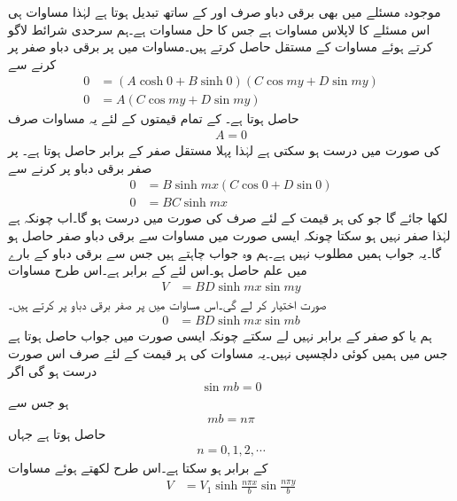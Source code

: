 موجودہ مسئلے میں بھی برقی دباو صرف  اور  کے ساتھ تبدیل ہوتا ہے لہٰذا مساوات  ہی اس مسئلے کا لاپلاس مساوات ہے جس کا حل مساوات  ہے۔ہم سرحدی شرائط لاگو کرتے ہوئے مساوات کے مستقل حاصل کرتے ہیں۔مساوات  میں  پر برقی دباو صفر پر کرنے سے
\begin{align*}
0&=\left( A \cosh 0+B \sinh 0\right) \left(C \cos m y+D \sin m y \right)\\
0&=A \left(C \cos m y+D \sin m y \right)
\end{align*}
حاصل ہوتا ہے۔  کے تمام قیمتوں کے لئے یہ مساوات صرف 
\begin{align*}
A=0
\end{align*}
کی صورت میں درست ہو سکتی ہے لہٰذا پہلا مستقل صفر کے برابر حاصل ہوتا ہے۔ پر صفر برقی دباو پر کرنے سے
\begin{align*}
0&=B \sinh mx  \left(C \cos 0+D \sin 0 \right)\\
0&=BC \sinh mx 
\end{align*}
لکھا جائے گا جو  کی ہر قیمت کے لئے صرف  کی صورت میں درست ہو گا۔اب چونکہ  ہے لہٰذا  صفر نہیں ہو سکتا چونکہ ایسی صورت میں مساوات  سے برقی دباو صفر حاصل ہو گا۔یہ جواب ہمیں مطلوب نہیں ہے۔ہم وہ جواب چاہتے ہیں جس سے برقی دباو کے بارے میں علم حاصل ہو۔اس لئے  کے برابر ہے۔اس طرح مساوات 
\begin{align}\label{مساوات_لاپلاس_ڈبہ_مثال}
V&=BD \sinh mx  \sin m y 
\end{align}
صورت اختیار کر لے گی۔اس مساوات میں  پر صفر برقی دباو پر کرتے ہیں۔
 \begin{align*}
0&=BD \sinh mx  \sin m b 
\end{align*}
ہم  یا  کو صفر کے برابر نہیں لے سکتے چونکہ ایسی صورت میں  جواب حاصل ہوتا ہے جس میں ہمیں کوئی دلچسپی نہیں۔یہ مساوات  کی ہر قیمت کے لئے صرف اس صورت درست ہو گی اگر 
\begin{align*}
\sin mb=0
\end{align*}
ہو جس سے
\begin{align*}
mb = n\pi 
\end{align*}
حاصل ہوتا ہے جہاں
\begin{align*}
n=0,1,2,\cdots
\end{align*}
کے برابر ہو سکتا ہے۔اس طرح  لکھتے ہوئے مساوات 
\begin{align}\label{مساوات_لاپلاس_ڈبہ_مثال_تین_شرائط_پورے}
V&=V_1 \sinh \frac{n\pi x}{b}  \sin \frac{n\pi y}{b} 
\end{align}
